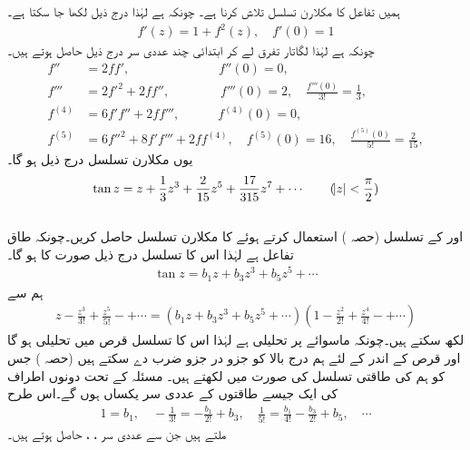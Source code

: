 ہمیں تفاعل  کا مکلارن تسلسل تلاش کرنا ہے۔ چونکہ  ہے لہٰذا درج ذیل لکھا جا سکتا ہے۔
\begin{align*}
f'(z)=1+f^2(z),\quad f'(0)=1
\end{align*}
چونکہ  ہے لہٰذا لگاتار تفرق لے کر ابتدائی چند عددی سر درج ذیل حاصل ہوتے ہیں۔
\begin{align*}
f''&=2ff',\quad \quad\quad \quad \quad \quad \quad  f''(0)=0,\\
f'''&=2f'^2+2ff'',\quad \quad\quad \quad  f'''(0)=2, \quad \frac{f'''(0)}{3!}=\frac{1}{3},\\
f^{(4)}&=6f'f''+2ff''',\quad \quad \quad f^{(4)}(0)=0,\\
f^{(5)}&=6f''^2+8f'f'''+2ff^{(4)},\quad f^{(5)}(0)=16,\quad \frac{f^{(5)}(0)}{5!}=\frac{2}{15},
\end{align*}
یوں مکلارن تسلسل درج ذیل ہو گا۔
\begin{align}
\tan z=z+\frac{1}{3}z^3+\frac{2}{15}z^5+\frac{17}{315}z^7+\cdots \quad \quad (\abs{z}<\frac{\pi}{2})
\end{align}
\quad {}\\
 اور  کے تسلسل (حصہ ) استعمال کرتے ہوئے  کا مکلارن تسلسل حاصل کریں۔چونکہ  طاق تفاعل ہے لہٰذا اس کا تسلسل درج ذیل صورت کا ہو گا۔
\begin{align*}
\tan z=b_1z+b_3z^3+b_5z^5+\cdots
\end{align*}
ہم سے 
\begin{align*}
z-\frac{z^3}{3!}+\frac{z^5}{5!}-+\cdots=(b_1z+b_3z^3+b_5z^5+\cdots)(1-\frac{z^2}{2!}+\frac{z^4}{4!}-+\cdots)
\end{align*}
لکھ سکتے ہیں۔چونکہ  ماسوائے  پر تحلیلی ہے لہٰذا اس کا تسلسل قرص  میں تحلیلی ہو گا اور قرص کے اندر  کے لئے ہم درج بالا کو جزو در جزو ضرب دے سکتے ہیں (حصہ ) جس کو ہم   کی طاقتی تسلسل کی صورت میں لکھتے ہیں۔ مسئلہ  کے تحت دونوں اطراف  کی ایک جیسے طاقتوں کے عددی سر یکساں ہوں گے۔اس طرح 
\begin{align*}
1=b_1,\quad -\frac{1}{3!}=-\frac{b_1}{2!}+b_3, \quad \frac{1}{5!}=\frac{b_1}{4!}-\frac{b_3}{2!}+b_5,\quad \cdots
\end{align*} 
ملتے ہیں جن سے عددی سر ، ،  حاصل ہوتے ہیں۔
